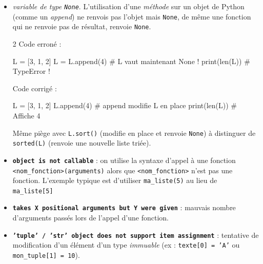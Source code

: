 \documentclass[11pt,a4paper]{article}
\begin{document}
\begin{tcolorbox}[left=0cm,title=\bf{\faBug \; 3. Erreurs de type (TypeError)},colbacktitle=cfond]
\begin{itemize}
	\item[\textbullet] \textit{variable de type {\tt None}}. L'utilisation d'une \textit{méthode} sur un objet de Python (comme un \textit{append}) ne renvois {\sc pas} l'objet mais {\tt None}, de même une fonction qui ne renvoie pas de résultat, renvoie {\tt None}.
	\begin{multicols}{2}
		\textcolor{BrickRed}{\faTimesCircle \; Code erroné :}
		\begin{python}
L = [3, 1, 2]
L = L.append(4)
# L vaut maintenant None !
print(len(L)) # TypeError !
		\end{python}
		\textcolor{OliveGreen}{\faCheckCircle \; Code corrigé :}
		\begin{python}
L = [3, 1, 2]
L.append(4)
# append modifie L en place
print(len(L)) # Affiche 4
		\end{python}
	\end{multicols}
	{\small \danger} Même piège avec \texttt{L.sort()} (modifie en place et renvoie \texttt{None}) à distinguer de \texttt{sorted(L)} (renvoie une nouvelle liste triée).

	\item[\textbullet] \textbf{\texttt{object is not callable}} : on utilise la syntaxe d'appel à une fonction {\tt <nom\_fonction>(arguments)} alors que {\tt <nom\_fonction>} n'est pas une fonction. L'exemple typique est d'utiliser {\tt ma\_liste(5)} au lieu de {\tt ma\_liste[5]} 
	\item[\textbullet] \textbf{\texttt{takes X positional arguments but Y were given}} : mauvais nombre d'arguments passés lors de l'appel d'une fonction.

	\item[\textbullet] \textbf{\texttt{'tuple' / 'str' object does not support item assignment}} : tentative de modification d'un élément d'un type \textit{immuable} (ex : \texttt{texte[0] = 'A'} ou \texttt{mon_tuple[1] = 10}).
\end{itemize}
\end{tcolorbox}
\end{document}
